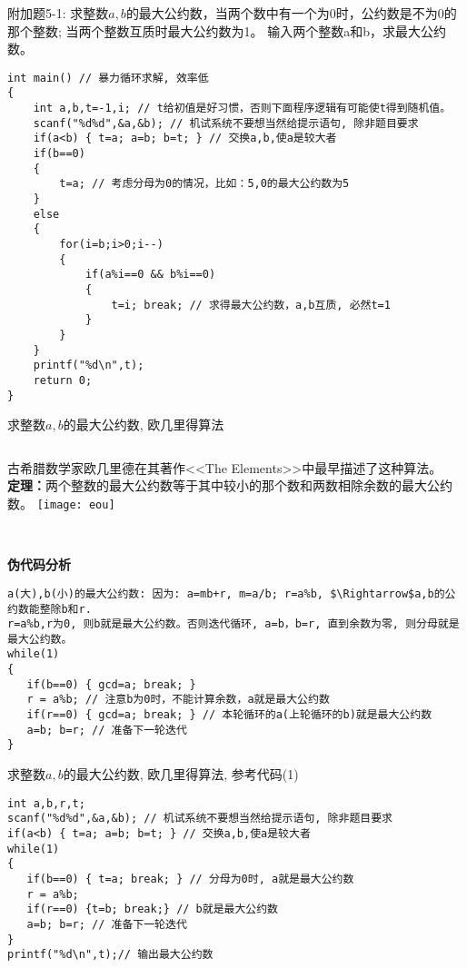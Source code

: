 \begin{frame}
附加题5-1: 求整数$a,b$的最大公约数，当两个数中有一个为0时，公约数是不为0的那个整数; 当两个整数互质时最大公约数为1。
输入两个整数a和b，求最大公约数。 
\pause
\begin{lstlisting}
int main() // 暴力循环求解, 效率低
{
	int a,b,t=-1,i; // t给初值是好习惯，否则下面程序逻辑有可能使t得到随机值。 
	scanf("%d%d",&a,&b); // 机试系统不要想当然给提示语句, 除非题目要求  
	if(a<b) { t=a; a=b; b=t; } // 交换a,b,使a是较大者 
	if(b==0) 
	{
		t=a; // 考虑分母为0的情况，比如：5,0的最大公约数为5 
	} 
	else
	{
		for(i=b;i>0;i--)
		{
			if(a%i==0 && b%i==0)
			{
				t=i; break; // 求得最大公约数，a,b互质, 必然t=1 
			}
		}
	}
	printf("%d\n",t);
	return 0;	
}
\end{lstlisting}
\end{frame}

\begin{frame}{求整数$a,b$的最大公约数, 欧几里得算法}
\begin{columns}
	古希腊数学家欧几里德在其著作<<The Elements>>中最早描述了这种算法。\\
	\textbf{定理：}两个整数的最大公约数等于其中较小的那个数和两数相除余数的最大公约数。
	\texttt{[image: eou]}
\end{columns}
~\\
\textbf{伪代码分析}
\begin{lstlisting}
a(大),b(小)的最大公约数: 因为: a=mb+r, m=a/b; r=a%b, $\Rightarrow$a,b的公约数能整除b和r.
r=a%b,r为0, 则b就是最大公约数。否则迭代循环, a=b，b=r, 直到余数为零, 则分母就是最大公约数。 
while(1)
{
   if(b==0) { gcd=a; break; }
   r = a%b; // 注意b为0时，不能计算余数，a就是最大公约数
   if(r==0) { gcd=a; break; } // 本轮循环的a(上轮循环的b)就是最大公约数
   a=b; b=r; // 准备下一轮迭代    
}
\end{lstlisting}
\end{frame}

\begin{frame}{求整数$a,b$的最大公约数, 欧几里得算法, 参考代码(1)}
\begin{lstlisting}
int a,b,r,t;
scanf("%d%d",&a,&b); // 机试系统不要想当然给提示语句, 除非题目要求
if(a<b) { t=a; a=b; b=t; } // 交换a,b,使a是较大者
while(1)
{
   if(b==0) { t=a; break; } // 分母为0时, a就是最大公约数
   r = a%b; 
   if(r==0) {t=b; break;} // b就是最大公约数
   a=b; b=r; // 准备下一轮迭代   
}
printf("%d\n",t);// 输出最大公约数
\end{lstlisting}
\end{frame}


